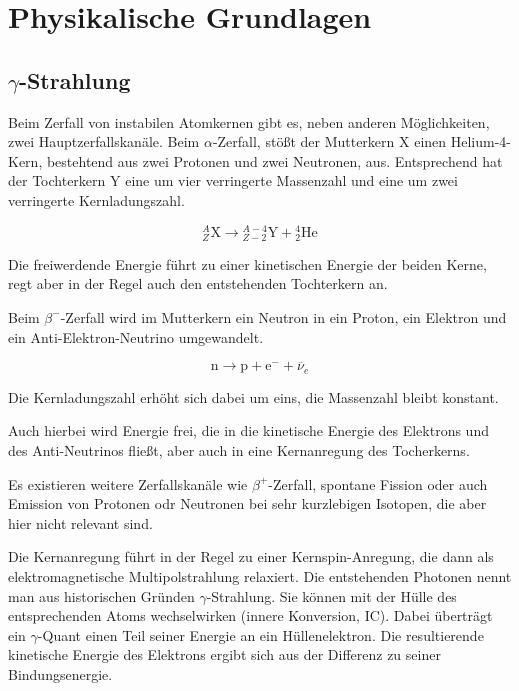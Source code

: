 \documentclass[a4paper,german,12pt,smallheadings]{scrartcl}
\begin{document}
\begin{titlepage}

\end{titlepage}

\allowdisplaybreaks %

\section{Physikalische Grundlagen}
\subsection{$\gamma$-Strahlung}

Beim Zerfall von instabilen Atomkernen gibt es, neben anderen Möglichkeiten,
zwei Hauptzerfallskanäle. Beim $\alpha$-Zerfall, stößt der Mutterkern
$\mathrm{X}$ einen Helium-4-Kern, bestehtend aus zwei Protonen und zwei
Neutronen, aus.  Entsprechend hat der Tochterkern $\mathrm{Y}$ eine um vier
verringerte Massenzahl und eine um zwei verringerte Kernladungszahl.

\begin{equation}
  {}^{A}_{Z} \mathrm{X} \to {}^{A-4}_{Z-2} \mathrm{Y} + {}^{4}_{2} \mathrm{He}
\end{equation}

Die freiwerdende Energie führt zu einer kinetischen Energie der beiden Kerne,
regt aber in der Regel auch den entstehenden Tochterkern an.

Beim $\beta^{-}$-Zerfall wird im Mutterkern ein Neutron in ein Proton, ein
Elektron und ein Anti-Elektron-Neutrino umgewandelt.

\begin{equation}
  \mathrm{n} \to \mathrm{p} + \mathrm{e}^{-} + \overline{\nu}_e
\end{equation}

Die Kernladungszahl erhöht sich dabei um eins, die Massenzahl bleibt konstant.

Auch hierbei wird Energie frei, die in die kinetische Energie des Elektrons und
des Anti-Neutrinos fließt, aber auch in eine Kernanregung des Tocherkerns.

Es existieren weitere Zerfallskanäle wie $\beta^+$-Zerfall, spontane Fission
oder auch Emission von Protonen odr Neutronen bei sehr kurzlebigen Isotopen,
die aber hier nicht relevant sind.

Die Kernanregung führt in der Regel zu einer Kernspin-Anregung, die dann als
elektromagnetische Multipolstrahlung relaxiert. Die entstehenden Photonen nennt
man aus historischen Gründen $\gamma$-Strahlung. Sie können mit der Hülle des
entsprechenden Atoms wechselwirken (innere Konversion, IC). Dabei überträgt ein
$\gamma$-Quant einen Teil seiner Energie an ein Hüllenelektron. Die
resultierende kinetische Energie des Elektrons ergibt sich aus der Differenz zu
seiner Bindungsenergie.
\end{document}
